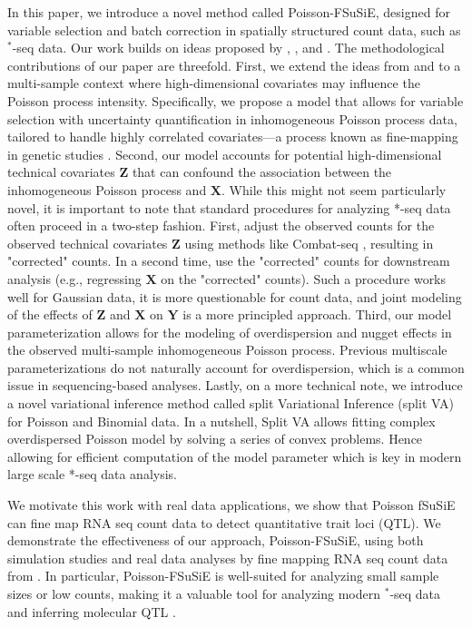 In this paper, we introduce a novel method called Poisson-FSuSiE, designed for variable selection and batch correction in spatially structured count data, such as $^*$-seq data. Our work builds on ideas proposed by \cite{kolaczyk_bayesian_1999}, \cite{xing_flexible_2019}, and \cite{shim_multi-scale_2021}. The methodological contributions of our paper are threefold. First, we extend the ideas from \cite{kolaczyk_bayesian_1999} and \cite{shim_multi-scale_2021} to a multi-sample context where high-dimensional covariates may influence the Poisson process intensity. Specifically, we propose a model that allows for variable selection with uncertainty quantification in inhomogeneous Poisson process data, tailored to handle highly correlated covariates—a process known as fine-mapping in genetic studies \cite{wang_simple_2020}. Second, our model accounts for potential high-dimensional technical covariates $\bm{Z}$ that can confound the association between the inhomogeneous Poisson process and $\bm{X}$. While this might not seem particularly novel, it is important to note that standard procedures for analyzing *-seq data often proceed in a two-step fashion. First, adjust the observed counts for the observed technical covariates $\bm{Z}$ using methods like Combat-seq \cite{zhang_combat-seq_2020}, resulting in "corrected" counts. In a second time, use the  "corrected" counts for downstream analysis (e.g., regressing $\bm{X}$ on the "corrected" counts). Such a procedure works well   for Gaussian data, it is more questionable for count data, and joint modeling of the effects of $\bm{Z}$ and $\bm{X}$ on $\bm{Y}$ is a more principled approach. Third, our model parameterization allows for the modeling of overdispersion and nugget effects in the observed multi-sample inhomogeneous Poisson process. Previous multiscale parameterizations \cite{kolaczyk_bayesian_1999, xing_flexible_2019,shim_multi-scale_2021} do not naturally account for overdispersion, which is a common issue in sequencing-based analyses. Lastly, on a more technical note, we introduce a novel variational inference method \citep{blei_variational_2017} called split Variational Inference (split VA) for Poisson and Binomial data. In a nutshell,  Split VA allows fitting complex overdispersed Poisson model by solving a  series of convex problems. Hence allowing for efficient computation of the model parameter which is key in modern large scale *-seq data analysis.

We motivate this work with real data applications, we show that Poisson fSuSiE can fine map RNA seq count data to detect  quantitative trait loci (QTL). We demonstrate the effectiveness of our approach, Poisson-FSuSiE, using both simulation studies and real data analyses by fine mapping   RNA seq count data from \cite{noauthor_gtex_2020}.  In particular, Poisson-FSuSiE is well-suited for analyzing small sample sizes or low counts, making it a valuable tool for analyzing modern $^*$-seq data and inferring molecular QTL \cite{aguet_molecular_2023}.

